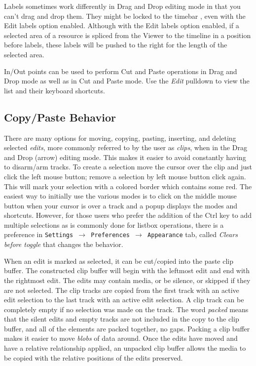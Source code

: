 Labels sometimes work differently in Drag and Drop editing mode in
that you can't drag and drop them. They might be locked to the
timebar , even with the Edit labels option enabled.  Although with
the Edit labels option enabled, if a selected area of a resource is
spliced from the Viewer to the timeline in a position before labels,
these labels will be pushed to the right for the length of the
selected area.

In/Out points can be used to perform Cut and Paste operations in
Drag and Drop mode as well as in Cut and Paste mode.  Use the \textit{Edit}
pulldown to view the list and their keyboard shortcuts.


\subsection{Copy/Paste Behavior}%
\label{sub:copy_paste_behavior}

There are many options for moving, copying, pasting, inserting, and
deleting selected \textit{edits}, more commonly referred to by the
user as \textit{clips}, when in the Drag and Drop (arrow) editing
mode.  This makes it easier to avoid constantly having to disarm/arm
tracks.  To create a selection  move the cursor over the clip and
just click the left mouse button; remove a selection by left mouse
button click again.  This will mark your selection with a colored
border which contains some red.  The easiest way to initially use
the various modes is to click on the middle mouse button when your
cursor is over a track and a popup displays the modes and shortcuts.
However, for those users who prefer the addition of the Ctrl key to
add multiple selections as is commonly done for listbox operations,
there is a preference in \texttt{Settings $\rightarrow$ Preferences
  $\rightarrow$ Appearance} tab, called \textit{Clears before
  toggle}  that changes the behavior.

When an edit is marked as selected, it can be cut/copied into the
paste clip buffer.  The constructed clip buffer will begin with the
leftmost edit and end with the rightmost edit.  The edits may
contain media, or be silence, or skipped if they are not selected.
The clip tracks are copied from the first track with an active edit
selection to the last track with an active edit selection.  A clip
track can be completely empty if no selection was made on the track.
The word \textit{packed} means that the silent edits and empty
tracks are not included in the copy to the clip buffer, and all of
the elements are packed together, no gaps.  Packing a clip buffer
makes it easier to move \textit{blobs} of data around.  Once the
edits have moved and have a relative relationship applied, an
unpacked clip buffer allows the media to be copied with the relative
positions of the edits preserved.

